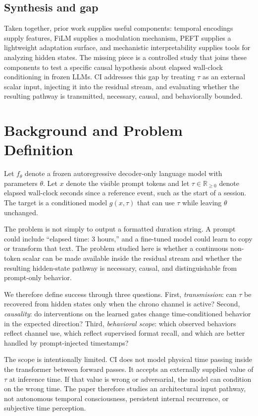 \documentclass[conference,10pt]{IEEEtran}
\newcommand{\CI}{\textsc{CI}}
\newcommand{\Tau}{\tau}
\begin{document}
\subsection{Synthesis and gap}

Taken together, prior work supplies useful components: temporal encodings supply features, FiLM supplies a modulation mechanism, PEFT supplies a lightweight adaptation surface, and mechanistic interpretability supplies tools for analyzing hidden states. The missing piece is a controlled study that joins these components to test a specific causal hypothesis about elapsed wall-clock conditioning in frozen LLMs. \CI{} addresses this gap by treating $\Tau$ as an external scalar input, injecting it into the residual stream, and evaluating whether the resulting pathway is transmitted, necessary, causal, and behaviorally bounded.

\section{Background and Problem Definition}

Let $f_\theta$ denote a frozen autoregressive decoder-only language model with parameters $\theta$. Let $x$ denote the visible prompt tokens and let $\Tau\in\mathbb{R}_{\geq0}$ denote elapsed wall-clock seconds since a reference event, such as the start of a session. The target is a conditioned model $g(x,\Tau)$ that can use $\Tau$ while leaving $\theta$ unchanged.

The problem is not simply to output a formatted duration string. A prompt could include ``elapsed time: 3 hours,'' and a fine-tuned model could learn to copy or transform that text. The problem studied here is whether a continuous non-token scalar can be made available inside the residual stream and whether the resulting hidden-state pathway is necessary, causal, and distinguishable from prompt-only behavior.

We therefore define success through three questions. First, \emph{transmission}: can $\Tau$ be recovered from hidden states only when the chrono channel is active? Second, \emph{causality}: do interventions on the learned gates change time-conditioned behavior in the expected direction? Third, \emph{behavioral scope}: which observed behaviors reflect channel use, which reflect supervised format recall, and which are better handled by prompt-injected timestamps?

The scope is intentionally limited. \CI{} does not model physical time passing inside the transformer between forward passes. It accepts an externally supplied value of $\Tau$ at inference time. If that value is wrong or adversarial, the model can condition on the wrong time. The paper therefore studies an architectural input pathway, not autonomous temporal consciousness, persistent internal recurrence, or subjective time perception.
\end{document}
